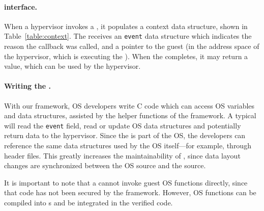 \documentclass[11pt]{article}
\begin{document}
\paragraph{\Hypercallback{} interface.} When a hypervisor invokes a \hypercallback,
it populates a context data structure, shown in Table~\ref{table:context}. The
\hypercallback{} receives an \texttt{event} data structure which indicates the reason
the callback was called, and a pointer to the guest (in the address space of the hypervisor,
which is executing the \hypercallback). When the \hypercallback{} completes, it may return a
value, which can be used by the hypervisor.

\paragraph{Writing the \hypercallback.} With our framework, OS developers write C code 
which can access OS variables and data structures, assisted by the helper functions of
the framework. A typical \hypercallback{} will read the \texttt{event} field, read or update
OS data structures and potentially return data to the hypervisor. Since the 
\hypercallback{} is part of the OS, the developers can reference the same data
structures used by the OS itself---for example, through header files. This greatly 
increases the maintainability of , since data layout changes 
are synchronized between the OS source and the \hypercallback{} source. 

It is important to note that a \hypercallback{} cannot invoke guest OS functions 
directly, since that code has not been secured by the framework. However, 
OS functions can be compiled into \hypercallback{}s and be integrated in 
the verified code.


\end{document}
